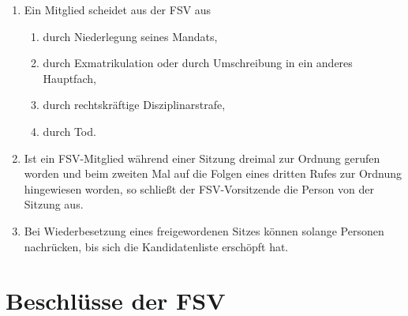 \documentclass{article}
\providecommand{\tightlist}{\setlength{\itemsep}{0pt}\setlength{\parskip}{0pt}}
\begin{document}
\begin{enumerate}[(1)]
	\item Ein Mitglied scheidet aus der FSV aus
	\begin{enumerate}[1.]
		\tightlist
		\item durch Niederlegung seines Mandats,
		\item durch Exmatrikulation oder durch Umschreibung in ein anderes Hauptfach,
		\item durch rechtskräftige Disziplinarstrafe,
		\item durch Tod.
	\end{enumerate}
	\item Ist ein FSV-Mitglied während einer Sitzung dreimal zur Ordnung gerufen worden und beim zweiten Mal auf die Folgen eines dritten Rufes zur Ordnung hingewiesen worden, so schließt der FSV-Vorsitzende die Person von der Sitzung aus.
	\item Bei Wiederbesetzung eines freigewordenen Sitzes können solange Personen nachrücken, bis sich die Kandidatenliste erschöpft hat.
\end{enumerate}

\section{Beschlüsse der FSV}\label{beschluxfcsse-der-fsv}
\end{document}
